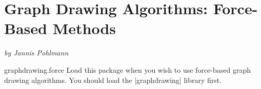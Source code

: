 %
%
%

\section{Graph Drawing Algorithms: Force-Based Methods}
\label{section-library-graphdrawing-force-based}
\label{section-first-graphdrawing-library-in-manual}

{\emph{by Jannis Pohlmann}}


\begin{tikzlibrary}{graphdrawing.force}
  Load this package when you wish to use force-based graph drawing
  algorithms. You should load the |graphdrawing| library first.
\end{tikzlibrary}

\ifluatex\relax{}\expandafter\endinput\fi


\subsection{Overview}


...

\subsubsection{Spring and Spring-Electrical Layouts}



